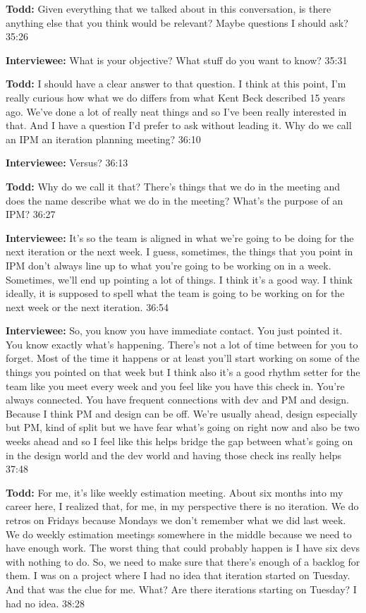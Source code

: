 \textbf{Todd:} Given everything that we talked about in this conversation, is there anything else that you think would be relevant? Maybe questions I should ask? 35:26

\textbf{Interviewee:} What is your objective? What stuff do you want to know? 35:31

\textbf{Todd:} I should have a clear answer to that question. I think at this point, I'm really curious how what we do differs from what Kent Beck described 15 years ago. We've done a lot of really neat things and so I've been really interested in that. And I have a question I'd prefer to ask without leading it. Why do we call an IPM an iteration planning meeting? 36:10

\textbf{Interviewee:} Versus? 36:13

\textbf{Todd:} Why do we call it that? There's things that we do in the meeting and does the name describe what we do in the meeting? What's the purpose of an IPM? 36:27

\textbf{Interviewee:} It's so the team is aligned in what we're going to be doing for the next iteration or the next week. I guess, sometimes, the things that you point in IPM don't always line up to what you're going to be working on in a week. Sometimes, we'll end up pointing a lot of things. I think it's a good way. I think ideally, it is supposed to spell what the team is going to be working on for the next week or the next iteration. 36:54

\textbf{Interviewee:} So, you know you have immediate contact. You just pointed it. You know exactly what's happening. There's not a lot of time between for you to forget. Most of the time it happens or at least you'll start working on some of the things you pointed on that week but I think also it's a good rhythm setter for the team like you meet every week and you feel like you have this check in. You're always connected. You have frequent connections with dev and PM and design. Because I think PM and design can be off. We're usually ahead, design especially but PM, kind of split but we have fear what's going on right now and also be two weeks ahead and so I feel like this helps bridge the gap between what's going on in the design world and the dev world and having those check ins really helps 37:48

\textbf{Todd:} For me, it's like weekly estimation meeting. About six months into my career here, I realized that, for me, in my perspective there is no iteration. We do retros on Fridays because Mondays we don't remember what we did last week. We do weekly estimation meetings somewhere in the middle because we need to have enough work. The worst thing that could probably happen is I have six devs with nothing to do. So, we need to make sure that there's enough of a backlog for them. I was on a project where I had no idea that iteration started on Tuesday. And that was the clue for me. What? Are there iterations starting on Tuesday? I had no idea. 38:28

